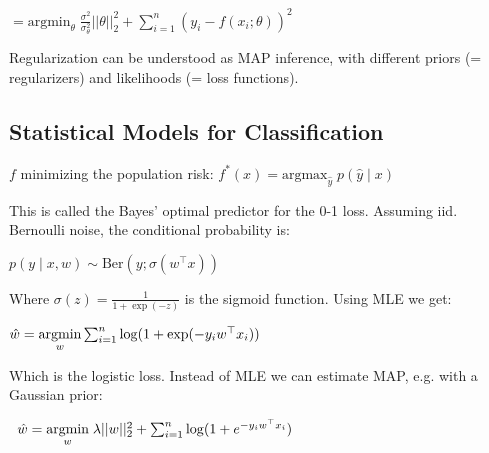\quad $= \text{argmin}_\theta \; \frac{\sigma^2}{\sigma_\theta^2} ||\theta||_2^2 + \sum_{i=1}^n(y_i - f(x_i; \theta))^2$

Regularization can be understood as MAP inference, with different priors (= regularizers) and likelihoods (= loss functions).


\subsection*{Statistical Models for Classification}

$f$ minimizing the population risk: $f^*(x) = \text{argmax}_{\hat y} \; p(\hat y \; | \; x)$

This is called the Bayes' optimal predictor for the 0-1 loss. Assuming iid. Bernoulli noise, the conditional probability is:

\qquad \qquad$p(y \; | \; x,w) \sim \text{Ber}(y; \sigma(w^\top x))$

Where $\sigma(z) = \frac{1}{1 + \exp(-z)}$ is the sigmoid function. Using MLE we get:

\quad \;$\hat w = \underset{w}{\text{argmin}} \sum_{i = 1}^n \log (1 + \exp(-y_i w^\top x_i))$

Which is the logistic loss. Instead of MLE we can estimate MAP, e.g. with a Gaussian prior:

$\; \;\hat w = \underset{w}{\text{argmin}} \; \lambda ||w||_2^2 + \sum_{i = 1}^n \log (1 + e^{-y_i w^\top x_i})$



